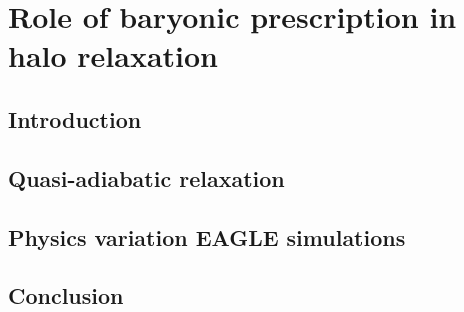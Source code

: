 \chapter{Role of baryonic prescription in halo relaxation}

\section{Introduction}

\section{Quasi-adiabatic relaxation}

\section{Physics variation EAGLE simulations}

\section{Conclusion}